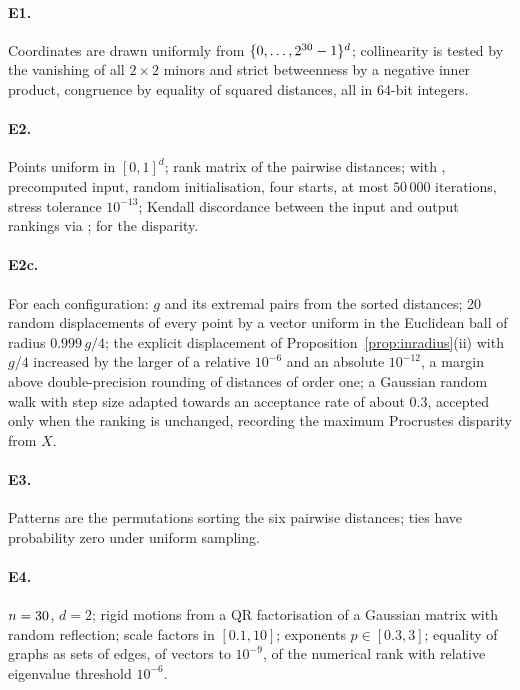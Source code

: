 \documentclass[11pt,a4paper]{article}
\theoremstyle{plain}
\theoremstyle{definition}
\theoremstyle{remark}
\begin{document}
\paragraph{E1.} Coordinates are drawn uniformly from $\{0,\dots,2^{30}-1\}^d$; collinearity is tested by the vanishing of all $2\times2$ minors and strict betweenness by a negative inner product, congruence by equality of squared distances, all in 64-bit integers.
\paragraph{E2.} Points uniform in $[0,1]^d$; rank matrix of the pairwise distances;  with , precomputed input, random initialisation, four starts, at most $50\,000$ iterations, stress tolerance $10^{-13}$; Kendall discordance between the input and output rankings via ;  for the disparity.
\paragraph{E2c.} For each configuration: $g$ and its extremal pairs from the sorted distances; 20 random displacements of every point by a vector uniform in the Euclidean ball of radius $0.999\,g/4$; the explicit displacement of Proposition~\ref{prop:inradius}(ii) with $g/4$ increased by the larger of a relative $10^{-6}$ and an absolute $10^{-12}$, a margin above double-precision rounding of distances of order one; a Gaussian random walk with step size adapted towards an acceptance rate of about $0.3$, accepted only when the ranking is unchanged, recording the maximum Procrustes disparity from $X$.
\paragraph{E3.} Patterns are the permutations sorting the six pairwise distances; ties have probability zero under uniform sampling.
\paragraph{E4.} $n=30$, $d=2$; rigid motions from a QR factorisation of a Gaussian matrix with random reflection; scale factors in $[0.1,10]$; exponents $p\in[0.3,3]$; equality of graphs as sets of edges, of vectors to $10^{-9}$, of the numerical rank with relative eigenvalue threshold $10^{-6}$.
\end{document}
